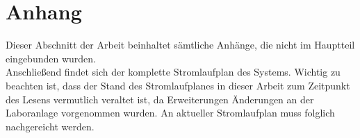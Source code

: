 \documentclass[../Bachelorarbeit.tex]{subfiles}
\begin{document}
\section*{Anhang} \label{anhang}
Dieser Abschnitt der Arbeit beinhaltet sämtliche Anhänge, die nicht im Hauptteil eingebunden wurden.\\
Anschließend findet sich der komplette Stromlaufplan des Systems. Wichtig zu beachten ist, dass der Stand des Stromlaufplanes in dieser Arbeit zum Zeitpunkt des Lesens vermutlich veraltet ist, da Erweiterungen \bzw Änderungen an der Laboranlage vorgenommen wurden. An aktueller Stromlaufplan muss folglich nachgereicht werden.\\













\end{document}
